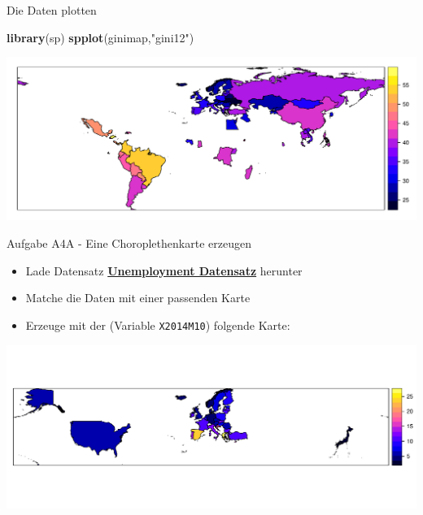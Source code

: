 \documentclass[ignorenonframetext,]{beamer}
\newenvironment{Shaded}{\begin{snugshade}}{\end{snugshade}}
\newcommand{\KeywordTok}[1]{\textcolor[rgb]{0.13,0.29,0.53}{\textbf{#1}}}
\newcommand{\StringTok}[1]{\textcolor[rgb]{0.31,0.60,0.02}{#1}}
\newcommand{\NormalTok}[1]{#1}
\providecommand{\tightlist}{%
  \setlength{\itemsep}{0pt}\setlength{\parskip}{0pt}}
\begin{document}
\begin{frame}[fragile]{Die Daten plotten}

\begin{Shaded}
\begin{Highlighting}[]
\KeywordTok{library}\NormalTok{(sp)}
\KeywordTok{spplot}\NormalTok{(ginimap,}\StringTok{"gini12"}\NormalTok{)}
\end{Highlighting}
\end{Shaded}

\includegraphics{slides_all2gether_part1_files/figure-beamer/unnamed-chunk-113-1.pdf}

\end{frame}

\begin{frame}[fragile]{Aufgabe A4A - Eine Choroplethenkarte erzeugen}

\begin{itemize}
\tightlist
\item
  Lade Datensatz
  \href{https://raw.githubusercontent.com/Japhilko/GeoData/master/2015/data/Unemployment.csv}{\textbf{Unemployment
  Datensatz}} herunter
\item
  Matche die Daten mit einer passenden Karte
\item
  Erzeuge mit der (Variable \texttt{X2014M10}) folgende Karte:
\end{itemize}

\includegraphics{slides_all2gether_part1_files/figure-beamer/unnamed-chunk-114-1.pdf}

\end{frame}
\end{document}
